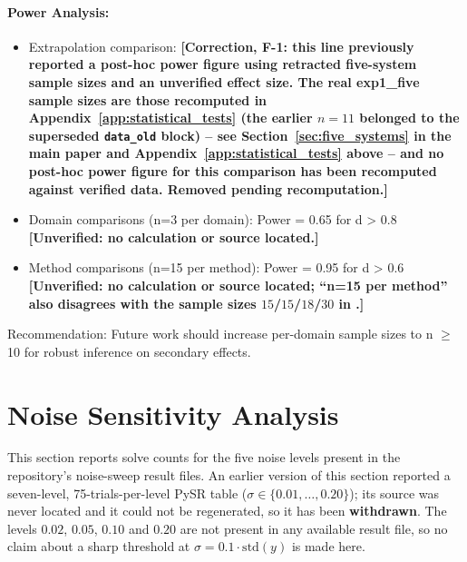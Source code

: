 \documentclass[twoside,11pt]{article}
\begin{document}
\paragraph{Power Analysis:}
\begin{itemize}
\item Extrapolation comparison: \textbf{[Correction, F-1: this line previously reported a post-hoc power figure using retracted five-system sample sizes and an unverified effect size. The real exp1\_five sample sizes are those recomputed in Appendix~\ref{app:statistical_tests} (the earlier $n=11$ belonged to the superseded \texttt{data\_old} block) -- see Section~\ref{sec:five_systems} in the main paper and Appendix~\ref{app:statistical_tests} above -- and no post-hoc power figure for this comparison has been recomputed against verified data. Removed pending recomputation.]}
\item Domain comparisons (n=3 per domain): Power = 0.65 for d > 0.8 \textbf{[Unverified: no calculation or source located.]}
\item Method comparisons (n=15 per method): Power = 0.95 for d > 0.6 \textbf{[Unverified: no calculation or source located; ``n=15 per method'' also disagrees with the sample sizes $15$/$15$/$18$/$30$ in .]}
\end{itemize}

Recommendation: Future work should increase per-domain sample sizes to n $\geq$ 10 for robust inference on secondary effects.



\section{Noise Sensitivity Analysis}
\label{app:noise_sensitivity}

This section reports solve counts for the five noise levels present in the
repository's noise-sweep result files. An earlier version of this section
reported a seven-level, 75-trials-per-level PySR table
($\sigma\in\{0.01,\dots,0.20\}$); its source was never located and it could not
be regenerated, so it has been \textbf{withdrawn}. The levels $0.02$, $0.05$,
$0.10$ and $0.20$ are not present in any available result file, so no claim
about a sharp threshold at $\sigma=0.1\cdot\mathrm{std}(y)$ is made here.
\end{document}
